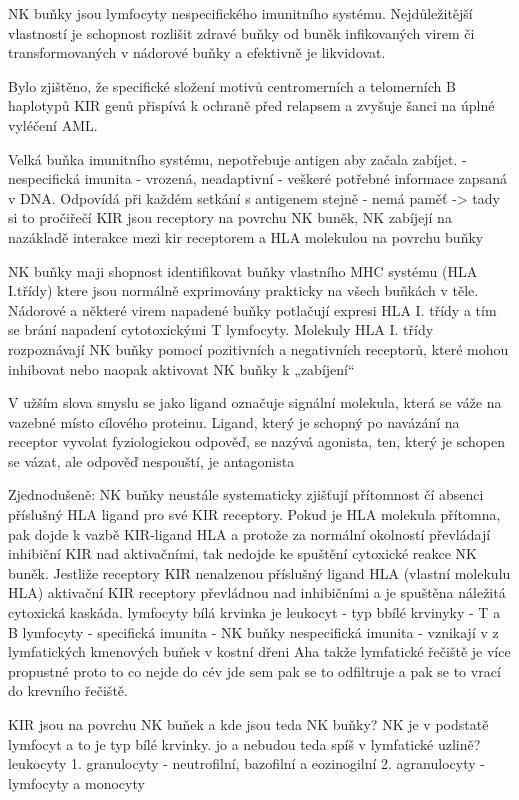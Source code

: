\documentclass[czech,DP]{thesiskiv}
\begin{document}
NK buňky jsou lymfocyty nespecifického imunitního systému.
Nejdůležitější vlastností je schopnost rozlišit zdravé buňky od buněk infikovaných virem či transformovaných v nádorové buňky a efektivně je likvidovat.

Bylo zjištěno, že
specifické složení motivů centromerních a telomerních B haplotypů KIR genů přispívá
k ochraně před relapsem a zvyšuje šanci na úplné vyléčení AML.

Velká buňka imunitního systému, nepotřebuje antigen aby začala zabíjet. 
-nespecifická imunita - vrozená, neadaptivní - veškeré potřebné informace zapsaná v DNA. Odpovídá při každém setkání s antigenem stejně - nemá paměť -> tady si to pročiřečí
KIR jsou receptory na povrchu NK buněk, 
NK zabíjejí na nazákladě interakce mezi kir receptorem a HLA molekulou na povrchu buňky

NK buňky maji shopnost identifikovat buňky vlastního MHC systému (HLA I.třídy) ktere jsou normálně exprimovány prakticky na všech buňkách v těle. 
Nádorové a některé virem napadené buňky potlačují
expresi HLA I. třídy a tím se brání napadení cytotoxickými T lymfocyty.
Molekuly HLA I. třídy rozpoznávají NK buňky pomocí pozitivních a negativních receptorů, které mohou inhibovat nebo naopak aktivovat NK buňky k „zabíjení“

V užším slova smyslu se jako ligand označuje signální molekula, která se váže na vazebné místo cílového proteinu. Ligand, který je schopný po navázání na receptor vyvolat fyziologickou odpověď, se nazývá agonista, ten, který je schopen se vázat, ale odpověď nespouští, je antagonista

Zjednodušeně: NK buňky neustále systematicky zjišťují přítomnost čí absenci příslušný HLA ligand pro své KIR receptory. 
Pokud je HLA molekula přítomna, pak dojde k vazbě KIR-ligand HLA a protože za normální okolností převládají inhibiční KIR nad aktivačními, tak nedojde ke spuštění cytoxické reakce NK buněk. Jestliže receptory KIR nenalzenou příslušný ligand HLA (vlastní molekulu HLA) aktivační KIR receptory převládnou nad inhibičními a je spuštěna náležitá cytoxická kaskáda.
lymfocyty 
bílá krvinka je leukocyt
- typ bbílé krvinyky 
- T a B lymfocyty - specifická imunita
- NK buňky nespecifická imunita
- vznikají v z lymfatických kmenových buňek v kostní dřeni
Aha takže lymfatické řečiště je více propustné proto to co nejde do cév jde sem pak se to odfiltruje a pak se to vrací do krevního řečiště.

KIR jsou na povrchu NK buňek a kde jsou teda NK buňky? 
NK je v podstatě lymfocyt a to je typ bílé krvinky. jo a nebudou teda spíš  v lymfatické uzlině? 
leukocyty 1. granulocyty - neutrofilní, bazofilní a eozinogilní
		2. agranulocyty - lymfocyty a monocyty
		
\end{document}
